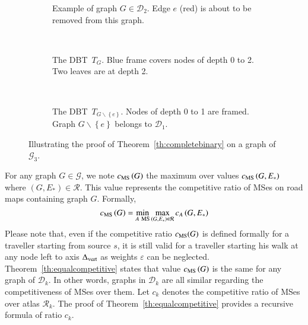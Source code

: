 \documentclass[preprint]{elsarticle}
\newcommand{\set}[1]{\left\{ #1 \right\}}
\newcommand{\mcalg}{\mathcal{G}}
\newcommand{\mcalr}{\mathcal{R}}
\newcommand{\mcald}{\mathcal{D}}
\newcommand{\mts}{MS}
\newcommand{\deltavert}{\Delta_{\mbox{\scriptsize{vert}}}}
\newcommand{\cms}{c_{\mbox{\scriptsize{MS}}}}
\newcommand{\ebt}{DBT}
\begin{document}
\begin{figure}[h]
\centering
\begin{subfigure}[b]{0.3\columnwidth}
\centering
\scalebox{.40}{}
\caption{Example of graph $G \in \mcald_2$. Edge $e$ (red) is about to be removed from this graph.}
\label{subfig:proofth1_a}
\end{subfigure}
~
\begin{subfigure}[b]{0.3\columnwidth}
\centering
\scalebox{.55}{}
\caption{The \ebt ~$T_{G}$. Blue frame covers nodes of depth 0 to 2. Two leaves are at depth 2.}
\label{subfig:proofth1_b}
\end{subfigure}
~
\begin{subfigure}[b]{0.3\columnwidth}
\centering
\scalebox{.55}{}
\caption{The \ebt ~$T_{G \backslash \set{e}}$. Nodes of depth 0 to 1 are framed. Graph $G\backslash \set{e}$ belongs to $\mcald_1$.}
\label{subfig:proofth1_c}
\end{subfigure}
\caption{Illustrating the proof of Theorem~\ref{th:completebinary} on a graph of $\mcalg_3$.}
\label{fig:proofth1}
\end{figure}


For any graph $G \in \mcalg$, we note $\cms\left(G\right)$ the maximum over values $\cms\left(G,E_*\right)$ where $\left(G,E_*\right) \in \mcalr$. This value represents the competitive ratio of \mts es on road maps containing graph $G$. Formally, 
\begin{equation}
\cms\left(G\right) = \min\limits_{A ~\mbox{\scriptsize {MS}}} \max\limits_{\left(G,E_*\right) \in \mcalr} c_A\left(G,E_*\right)
\label{eq:cmsg}
\end{equation}
Please note that, even if the competitive ratio $\cms(G)$ is defined formally for a traveller starting from source $s$, it is still valid for a traveller starting his walk at any node left to axis $\deltavert$ as weights $\varepsilon$ can be neglected. Theorem~\ref{th:equalcompetitive} states that value $\cms\left(G\right)$ is the same for any graph of $\mcald_k$. In other words, graphs in $\mcald_k$ are all similar regarding the competitiveness of \mts es over them. Let $c_k$ denotes the competitive ratio of \mts es over atlas $\mcalr_k$. The proof of Theorem~\ref{th:equalcompetitive} provides a recursive formula of ratio $c_k$.
\end{document}
